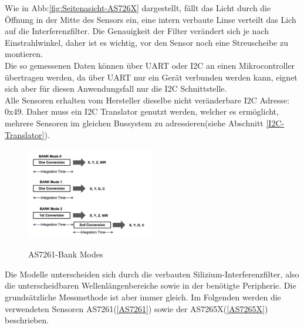 \noindent Wie in Abb:\ref{fig:Seitenasicht-AS726X} dargestellt, fällt das Licht durch die Öffnung in der Mitte des Sensors ein, eine intern verbaute Linse verteilt das Lich auf die Interferenzfilter. Die Genauigkeit der Filter verändert sich je nach Einstrahlwinkel, daher ist es wichtig, vor den Sensor noch eine Streuscheibe zu montieren.\\
Die so gemessenen Daten können über UART oder I2C an einen Mikrocontroller übertragen werden, da über UART nur ein Gerät verbunden werden kann, eignet sich aber für diesen Anwendungsfall nur die I2C Schnittstelle.\\
Alle Sensoren erhalten vom Hersteller dieselbe nicht veränderbare I2C Adresse: 0x49. Daher muss ein I2C Translator genutzt werden, welcher es ermöglicht, mehrere Sensoren im gleichen Bussystem zu adressieren(siehe Abschnitt \ref{I2C-Translator}).\\
\begin{figure}
\centering
\caption{AS7261-Bank Modes}
\includegraphics[width=0.5\textwidth]{img/AS7261-Bank_Modes.png}
\label{fig:AS7261-Bank_Modes}
\end{figure}

\noindent Die Modelle unterscheiden sich durch die verbauten Silizium-Interferenzfilter, also die unterscheidbaren Wellenlängenbereiche sowie in der benötigte Peripherie.
Die grundsätzliche Messmethode ist aber immer gleich.
Im Folgenden werden die verwendeten Sensoren AS7261(\ref{AS7261}) sowie der AS7265X(\ref{AS7265X}) beschrieben.



